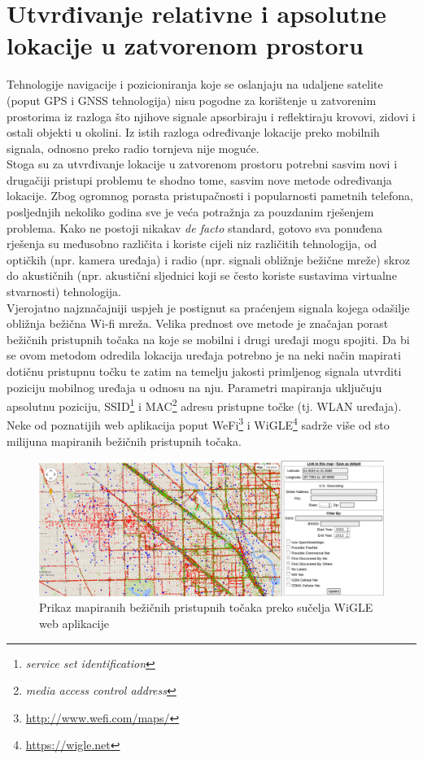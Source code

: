 \chapter{Utvrđivanje relativne i apsolutne lokacije u zatvorenom prostoru}
\label{chap:procjenaLokacije}

Tehnologije navigacije i pozicioniranja koje se oslanjaju na udaljene satelite (poput GPS i GNSS tehnologija) nisu pogodne za korištenje u zatvorenim prostorima iz razloga što njihove signale apsorbiraju i reflektiraju krovovi, zidovi i ostali objekti u okolini. 
Iz istih razloga određivanje lokacije preko mobilnih signala, odnosno preko radio tornjeva nije moguće. 
\\
Stoga su za utvrđivanje lokacije u zatvorenom prostoru potrebni sasvim novi i drugačiji pristupi problemu te shodno tome, sasvim nove metode određivanja lokacije. 
Zbog ogromnog porasta pristupačnosti i popularnosti pametnih telefona, posljednjih nekoliko godina sve je veća potražnja za pouzdanim rješenjem problema. 
Kako ne postoji nikakav \textit{de facto} standard, gotovo sva ponuđena rješenja su međusobno različita i koriste cijeli niz različitih tehnologija, od optičkih (npr. kamera uređaja) i radio (npr. signali obližnje bežične mreže) skroz do akustičnih (npr. akustični sljednici koji se često koriste sustavima virtualne stvarnosti) tehnologija.
\\

Vjerojatno najznačajniji uspjeh je postignut sa praćenjem signala kojega odašilje obližnja bežična Wi-fi mreža. 
Velika prednost ove metode je značajan porast bežičnih pristupnih točaka na koje se mobilni i drugi uređaji mogu spojiti. 
Da bi se ovom metodom odredila lokacija uređaja potrebno je na neki način mapirati dotičnu pristupnu točku te zatim na temelju jakosti primljenog signala utvrditi poziciju mobilnog uređaja u odnosu na nju. 
Parametri mapiranja uključuju apsolutnu poziciju, SSID\footnote{\textit{service set identification}} i MAC\footnote{\textit{media access control address}} adresu pristupne točke (tj. WLAN uređaja). 
Neke od poznatijih web aplikacija poput WeFi\footnote{\url{http://www.wefi.com/maps/}} i WiGLE\footnote{\url{https://wigle.net}} sadrže više od sto milijuna mapiranih bežičnih pristupnih točaka. 
\\

\begin{figure}
    \centering
    \includegraphics[scale=0.3]{pictures/WiGLE}
    \caption{Prikaz mapiranih bežičnih pristupnih točaka preko sučelja WiGLE web aplikacije}    
\end{figure}

